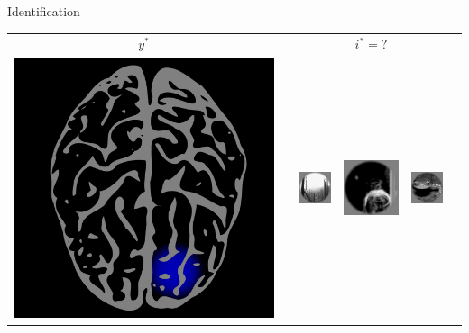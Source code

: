\documentclass[final]{beamer}
\newlength{\onecolwid}
\begin{document}
\begin{frame}[t]
\begin{columns}[t]
\begin{column}{\onecolwid}
\begin{block}{Identification}
\begin{center}
\begin{tabular}{c|c|cccc}
\hline
$y^*$ &     & &  $i^* = ?$  &   \\
\includegraphics[scale = 0.09]{brain7.png} & \hspace{0.5in} 
& \includegraphics[scale = .7]{img5.png}
& \includegraphics[scale = .7]{img6.png}
& \includegraphics[scale = .7]{img7.png}

\end{tabular}
\end{center}
\end{block}
\end{column}
\end{columns}
\end{frame}
\end{document}
